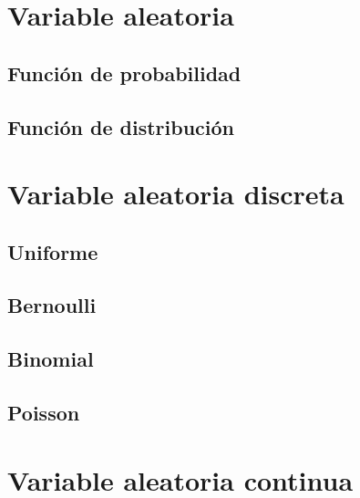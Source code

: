 \documentclass[
]{book}
\begin{document}
\hypertarget{variable-aleatoria}{%
\section{Variable aleatoria}\label{variable-aleatoria}}

\hypertarget{funciuxf3n-de-probabilidad-1}{%
\subsection{Función de probabilidad}\label{funciuxf3n-de-probabilidad-1}}

\hypertarget{funciuxf3n-de-distribuciuxf3n}{%
\subsection{Función de distribución}\label{funciuxf3n-de-distribuciuxf3n}}

\hypertarget{variable-aleatoria-discreta}{%
\section{Variable aleatoria discreta}\label{variable-aleatoria-discreta}}

\hypertarget{uniforme}{%
\subsection{Uniforme}\label{uniforme}}

\hypertarget{bernoulli}{%
\subsection{Bernoulli}\label{bernoulli}}

\hypertarget{binomial}{%
\subsection{Binomial}\label{binomial}}

\hypertarget{poisson}{%
\subsection{Poisson}\label{poisson}}

\hypertarget{variable-aleatoria-continua}{%
\section{Variable aleatoria continua}\label{variable-aleatoria-continua}}
\end{document}
